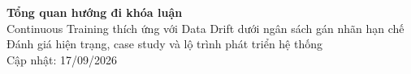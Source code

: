 \documentclass[11pt,a4paper]{article}
\begin{document}
\begin{center}
  {\Large\bfseries Tổng quan hướng đi khóa luận}\\[0.35em]
  {\large Continuous Training thích ứng với Data Drift dưới ngân sách gán nhãn hạn chế}\\[0.35em]
  Đánh giá hiện trạng, case study và lộ trình phát triển hệ thống\\[0.25em]
  {\small Cập nhật: 17/09/2026}
\end{center}










\end{document}
